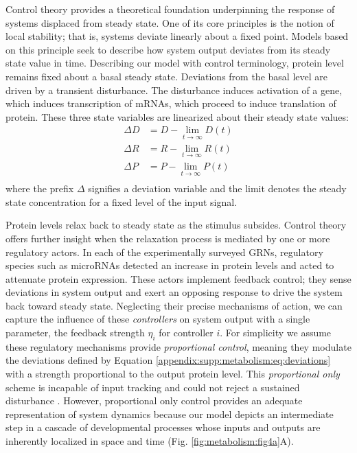 Control theory provides a theoretical foundation underpinning the response of systems displaced from steady state. One of its core principles is the notion of local stability; that is, systems deviate linearly about a fixed point. Models based on this principle seek to describe how system output deviates from its steady state value in time. Describing our model with control terminology, protein level remains fixed about a basal steady state. Deviations from the basal level are driven by a transient disturbance. The disturbance induces activation of a gene, which induces transcription of mRNAs, which proceed to induce translation of protein. These three state variables are linearized about their steady state values:
\begin{equation}
\label{appendix:supp:metabolism:model:deviations}
\begin{aligned}
\Delta D &= D - \lim_{t \to \infty} D(t) \\
\Delta R &= R - \lim_{t \to \infty} R(t) \\
\Delta P &= P - \lim_{t \to \infty} P(t) \\
\end{aligned}
\end{equation}
where the prefix $\Delta$ signifies a deviation variable and the limit denotes the steady state concentration for a fixed level of the input signal.

Protein levels relax back to steady state as the stimulus subsides. Control theory offers further insight when the relaxation process is mediated by one or more regulatory actors. In each of the experimentally surveyed GRNs, regulatory species such as microRNAs detected an increase in protein levels and acted to attenuate protein expression. These actors implement feedback control; they sense deviations in system output and exert an opposing response to drive the system back toward steady state. Neglecting their precise mechanisms of action, we can capture the influence of these \emph{controllers} on system output with a single parameter, the feedback strength $\eta_i$ for controller $i$. For simplicity we assume these regulatory mechanisms provide \emph{proportional control}, meaning they modulate the deviations defined by Equation \ref{appendix:supp:metabolism:eq:deviations} with a strength proportional to the output protein level. This \emph{proportional only} scheme is incapable of input tracking and could not reject a sustained disturbance \cite{Yao2003}. However, proportional only control provides an adequate representation of system dynamics because our model depicts an intermediate step in a cascade of developmental processes whose inputs and outputs are inherently localized in space and time (Fig. \ref{fig:metabolism:fig4a}A).

